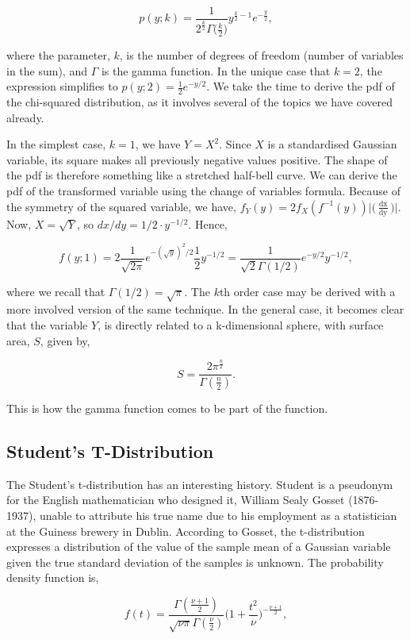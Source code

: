 \documentclass[11pt]{amsart}
\begin{document}
$$p(y; k) = \frac{1}{2^{\frac{k}{2}}\Gamma\big(\frac{k}{2}\big)}y^{\frac{k}{2} - 1}e^{-\frac{y}{2}},$$

where the parameter, $k$, is the number of degrees of freedom (number of variables in the sum), and $\Gamma$ is the gamma function. In the unique case that $k = 2$, the expression simplifies to $p(y; 2) = \frac{1}{2}e^{-y/2}$. We take the time to derive the pdf of the chi-squared distribution, as it involves several of the topics we have covered already.

In the simplest case, $k = 1$, we have $Y = X^2$. Since $X$ is a standardised Gaussian variable, its square makes all previously negative values positive. The shape of the pdf is therefore something like a stretched half-bell curve. We can derive the pdf of the transformed variable using the change of variables formula. Because of the symmetry of the squared variable, we have, $f_Y(y) = 2f_X(f^{-1}(y))\Big|\Big(\frac{\mathop{dx}}{\mathop{dy}}\Big)\Big|$. Now, $X = \sqrt{Y}$, so $dx/dy = 1/2\cdot y^{-1/2} $. Hence,

$$f(y; 1) = 2\frac{1}{\sqrt{2\pi}}e^{-(\sqrt{y})^2/2}\frac{1}{2}y^{-1/2} = \frac{1}{\sqrt{2}\Gamma(1/2)}e^{-y/2}y^{-1/2},$$

where we recall that $\Gamma(1/2) = \sqrt{\pi}$. The $k$th order case may be derived with a more involved version of the same technique. In the general case, it becomes clear that the variable $Y$, is directly related to a k-dimensional sphere, with surface area, $S$, given by,

$$S = \frac{2\pi^{\frac{n}{2}}}{\Gamma(\frac{n}{2})}.$$

This is how the gamma function comes to be part of the function.

\subsection{Student's T-Distribution}

The Student's t-distribution has an interesting history. Student is a pseudonym for the English mathematician who designed it, William Sealy Gosset (1876-1937), unable to attribute his true name due to his employment as a statistician at the Guiness brewery in Dublin. According to Gosset, the t-distribution expresses a distribution of the value of the sample mean of a Gaussian variable given the true standard deviation of the samples is unknown. The probability density function is,

$$f(t) = \frac{\Gamma(\frac{\nu + 1}{2})}{\sqrt{\nu\pi}\Gamma(\frac{\nu}{2})}\Bigg(1 + \frac{t^2}{\nu}\Bigg)^{-\frac{\nu + 1}{2}},$$
\end{document}
